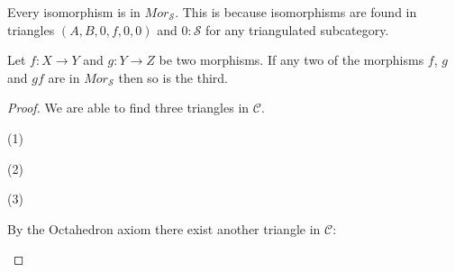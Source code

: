     \begin{remark}
        Every isomorphism is in $Mor_{\mathcal{S}}$. This is because isomorphisms are found in triangles $(A,B,0,f,0,0)$ and $0 : \mathcal{S}$ for any triangulated subcategory.
    \end{remark}

    \begin{lemma}
        Let $f : X \rightarrow Y$ and $g : Y \rightarrow Z$ be two morphisms. If any two of the morphisms $f$, $g$ and $gf$ are in $Mor_{\mathcal{S}}$ then so is the third.
    \end{lemma}

    \begin{proof}
        We are able to find three triangles in $\mathcal{C}$.
        \begin{center}
            (1)
            (2)
            (3)
        \end{center}
        By the Octahedron axiom there exist another triangle in $\mathcal{C}$:
        \begin{center}

\end{center}
\end{proof}
